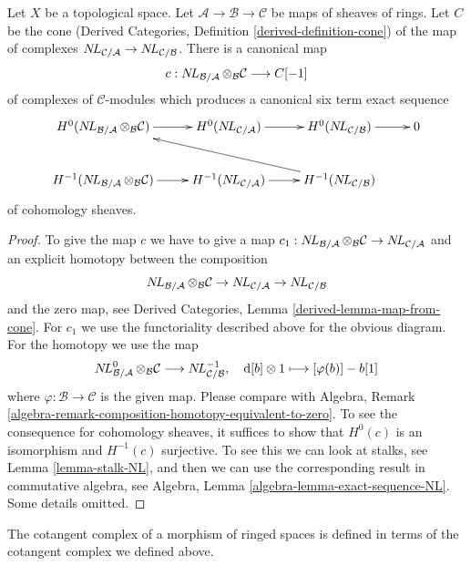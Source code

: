 \begin{lemma}
\label{lemma-exact-sequence-NL}
Let $X$ be a topological space. Let
$\mathcal{A} \to \mathcal{B} \to \mathcal{C}$
be maps of sheaves of rings. Let $C$ be the cone
(Derived Categories, Definition \ref{derived-definition-cone})
of the map of complexes
$\mathop{N\!L}\nolimits_{\mathcal{C}/\mathcal{A}} \to \mathop{N\!L}\nolimits_{\mathcal{C}/\mathcal{B}}$.
There is a canonical map
$$
c :
\mathop{N\!L}\nolimits_{\mathcal{B}/\mathcal{A}} \otimes_\mathcal{B} \mathcal{C}
\longrightarrow
C[-1]
$$
of complexes of $\mathcal{C}$-modules
which produces a canonical six term exact sequence
$$
\xymatrix{
H^0(\NL_{\mathcal{B}/\mathcal{A}} \otimes_\mathcal{B} \mathcal{C}) \ar[r] &
H^0(\NL_{\mathcal{C}/\mathcal{A}}) \ar[r] &
H^0(\NL_{\mathcal{C}/\mathcal{B}}) \ar[r] &
0 \\
H^{-1}(\NL_{\mathcal{B}/\mathcal{A}} \otimes_\mathcal{B} \mathcal{C}) \ar[r] &
H^{-1}(\NL_{\mathcal{C}/\mathcal{A}}) \ar[r] &
H^{-1}(\NL_{\mathcal{C}/\mathcal{B}}) \ar[llu]
}
$$
of cohomology sheaves.
\end{lemma}

\begin{proof}
To give the map $c$ we have to give a map
$c_1 : \mathop{N\!L}\nolimits_{\mathcal{B}/\mathcal{A}} \otimes_\mathcal{B} \mathcal{C}
\to \mathop{N\!L}\nolimits_{\mathcal{C}/\mathcal{A}}$ and an explicit homotopy
between the composition
$$
\mathop{N\!L}\nolimits_{\mathcal{B}/\mathcal{A}} \otimes_\mathcal{B} \mathcal{C} \to
\mathop{N\!L}\nolimits_{\mathcal{C}/\mathcal{A}} \to \mathop{N\!L}\nolimits_{\mathcal{C}/\mathcal{B}}
$$
and the zero map, see
Derived Categories, Lemma \ref{derived-lemma-map-from-cone}.
For $c_1$ we use the functoriality described
above for the obvious diagram. For the homotopy we use the map
$$
\mathop{N\!L}\nolimits_{\mathcal{B}/\mathcal{A}}^0 \otimes_\mathcal{B} \mathcal{C}
\longrightarrow
\mathop{N\!L}\nolimits_{\mathcal{C}/\mathcal{B}}^{-1},\quad
\text{d}[b] \otimes 1 \longmapsto [\varphi(b)] - b[1]
$$
where $\varphi : \mathcal{B} \to \mathcal{C}$ is the given map.
Please compare with
Algebra, Remark \ref{algebra-remark-composition-homotopy-equivalent-to-zero}.
To see the consequence for cohomology sheaves, it suffices to show
that $H^0(c)$ is an isomorphism and $H^{-1}(c)$ surjective.
To see this we can look at stalks, see Lemma \ref{lemma-stalk-NL},
and then we can use the corresponding result in commutative algebra,
see Algebra, Lemma \ref{algebra-lemma-exact-sequence-NL}.
Some details omitted.
\end{proof}

\noindent
The cotangent complex of a morphism of ringed spaces is defined
in terms of the cotangent complex we defined above.

